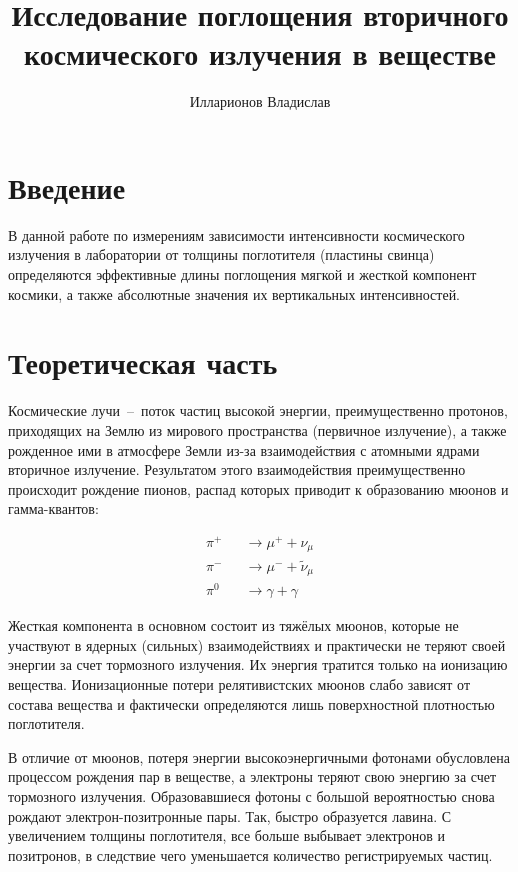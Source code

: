 \documentclass[reprint, nofootinbib, nobalancelastpage, 10pt]{revtex4-2}
\begin{document}
\title{Исследование поглощения вторичного космического излучения в веществе}
\author{Илларионов Владислав}

\maketitle


\section*{Введение}

В данной работе по измерениям зависимости интенсивности космического излучения в
лаборатории от толщины поглотителя (пластины свинца) определяются эффективные длины
поглощения мягкой и жесткой компонент космики, а также абсолютные значения их вертикальных
интенсивностей.


\section*{Теоретическая часть}

Космические лучи~--~поток частиц высокой энергии, преимущественно протонов, приходящих
на Землю из мирового пространства (первичное излучение), а также рожденное ими в атмосфере
Земли из-за взаимодействия с атомными ядрами вторичное излучение. Результатом этого
взаимодействия преимущественно происходит рождение пионов, распад которых приводит к
образованию мюонов и гамма-квантов:

\begin{eqnarray*}
	\pi^+ &&\rightarrow \mu^+ + \nu_{\mu} \\
	\pi^- &&\rightarrow \mu^- + \widetilde{\nu}_{\mu} \\
	\pi^0 &&\rightarrow \gamma + \gamma
\end{eqnarray*}

Жесткая компонента в основном состоит из тяжёлых мюонов, которые не участвуют в ядерных
(сильных) взаимодействиях и практически не теряют своей энергии за счет тормозного излучения.
Их энергия тратится только на ионизацию вещества. Ионизационные потери релятивистских мюонов
слабо зависят от состава вещества и фактически определяются лишь поверхностной плотностью
поглотителя.

В отличие от мюонов, потеря энергии высокоэнергичными фотонами обусловлена процессом
рождения пар в веществе, а электроны теряют свою энергию за счет тормозного излучения.
Образовавшиеся фотоны с большой вероятностью снова рождают электрон-позитронные пары.
Так, быстро образуется лавина. С увеличением толщины поглотителя, все больше выбывает
электронов и позитронов, в следствие чего уменьшается количество регистрируемых частиц. 
\end{document}
